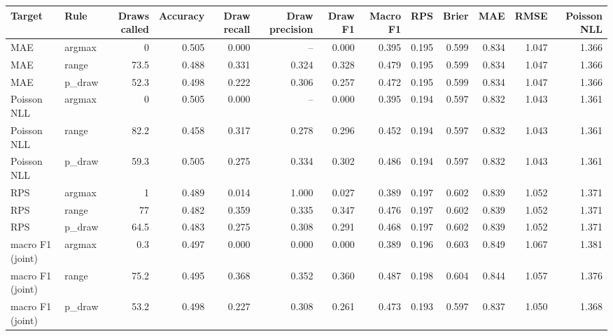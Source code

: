 
\begin{tabular}{llrrrrrrrrrrr}
\toprule
Target & Rule & Draws called & Accuracy & Draw recall & Draw precision & Draw F1 & Macro F1 & RPS & Brier & MAE & RMSE & Poisson NLL\\
\midrule
MAE & argmax & 0 & 0.505 & 0.000 & -- & 0.000 & 0.395 & 0.195 & 0.599 & 0.834 & 1.047 & 1.366\\
MAE & range & 73.5 & 0.488 & 0.331 & 0.324 & 0.328 & 0.479 & 0.195 & 0.599 & 0.834 & 1.047 & 1.366\\
MAE & p\_draw & 52.3 & 0.498 & 0.222 & 0.306 & 0.257 & 0.472 & 0.195 & 0.599 & 0.834 & 1.047 & 1.366\\
Poisson NLL & argmax & 0 & 0.505 & 0.000 & -- & 0.000 & 0.395 & 0.194 & 0.597 & 0.832 & 1.043 & 1.361\\
Poisson NLL & range & 82.2 & 0.458 & 0.317 & 0.278 & 0.296 & 0.452 & 0.194 & 0.597 & 0.832 & 1.043 & 1.361\\
Poisson NLL & p\_draw & 59.3 & 0.505 & 0.275 & 0.334 & 0.302 & 0.486 & 0.194 & 0.597 & 0.832 & 1.043 & 1.361\\
RPS & argmax & 1 & 0.489 & 0.014 & 1.000 & 0.027 & 0.389 & 0.197 & 0.602 & 0.839 & 1.052 & 1.371\\
RPS & range & 77 & 0.482 & 0.359 & 0.335 & 0.347 & 0.476 & 0.197 & 0.602 & 0.839 & 1.052 & 1.371\\
RPS & p\_draw & 64.5 & 0.483 & 0.275 & 0.308 & 0.291 & 0.468 & 0.197 & 0.602 & 0.839 & 1.052 & 1.371\\
macro F1 (joint) & argmax & 0.3 & 0.497 & 0.000 & 0.000 & 0.000 & 0.389 & 0.196 & 0.603 & 0.849 & 1.067 & 1.381\\
macro F1 (joint) & range & 75.2 & 0.495 & 0.368 & 0.352 & 0.360 & 0.487 & 0.198 & 0.604 & 0.844 & 1.057 & 1.376\\
macro F1 (joint) & p\_draw & 53.2 & 0.498 & 0.227 & 0.308 & 0.261 & 0.473 & 0.193 & 0.597 & 0.837 & 1.050 & 1.368\\
\bottomrule
\end{tabular}
